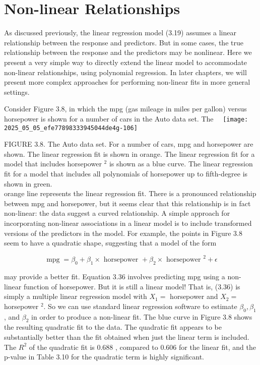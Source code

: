 \documentclass[10pt]{article}
\begin{document}
\section*{Non-linear Relationships}
As discussed previously, the linear regression model (3.19) assumes a linear relationship between the response and predictors. But in some cases, the true relationship between the response and the predictors may be nonlinear. Here we present a very simple way to directly extend the linear model to accommodate non-linear relationships, using polynomial regression. In later chapters, we will present more complex approaches for performing non-linear fits in more general settings.

Consider Figure 3.8, in which the mpg (gas mileage in miles per gallon) versus horsepower is shown for a number of cars in the Auto data set. The\
\
\texttt{[image: 2025\_05\_05\_efe77898333945044de4g-106]}

FIGURE 3.8. The Auto data set. For a number of cars, mpg and horsepower are shown. The linear regression fit is shown in orange. The linear regression fit for a model that includes horsepower ${ }^{2}$ is shown as a blue curve. The linear regression fit for a model that includes all polynomials of horsepower up to fifth-degree is shown in green.\\
orange line represents the linear regression fit. There is a pronounced relationship between mpg and horsepower, but it seems clear that this relationship is in fact non-linear: the data suggest a curved relationship. A simple approach for incorporating non-linear associations in a linear model is to include transformed versions of the predictors in the model. For example, the points in Figure 3.8 seem to have a quadratic shape, suggesting that a model of the form


\begin{equation*}
\operatorname{mpg}=\beta_{0}+\beta_{1} \times \text { horsepower }+\beta_{2} \times \text { horsepower }^{2}+\epsilon \tag{3.36}
\end{equation*}


may provide a better fit. Equation 3.36 involves predicting mpg using a non-linear function of horsepower. But it is still a linear model! That is, (3.36) is simply a multiple linear regression model with $X_{1}=$ horsepower and $X_{2}=$ horsepower ${ }^{2}$. So we can use standard linear regression software to estimate $\beta_{0}, \beta_{1}$, and $\beta_{2}$ in order to produce a non-linear fit. The blue curve in Figure 3.8 shows the resulting quadratic fit to the data. The quadratic fit appears to be substantially better than the fit obtained when just the linear term is included. The $R^{2}$ of the quadratic fit is 0.688 , compared to 0.606 for the linear fit, and the p-value in Table 3.10 for the quadratic term is highly significant.
\end{document}
